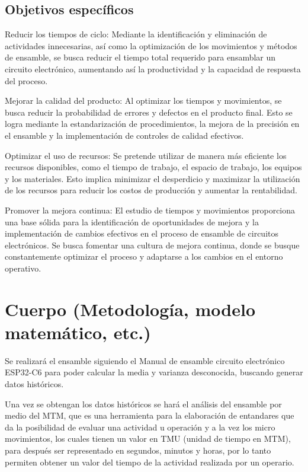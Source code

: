      \subsection{Objetivos específicos}
     
     Reducir los tiempos de ciclo: Mediante la identificación y eliminación de actividades innecesarias, así como la optimización de los movimientos y métodos de ensamble, se busca reducir el tiempo total requerido para ensamblar un circuito electrónico, aumentando así la productividad y la capacidad de respuesta del proceso.
     
     Mejorar la calidad del producto: Al optimizar los tiempos y movimientos, se busca reducir la probabilidad de errores y defectos en el producto final. Esto se logra mediante la estandarización de procedimientos, la mejora de la precisión en el ensamble y la implementación de controles de calidad efectivos.
     
      Optimizar el uso de recursos: Se pretende utilizar de manera más eficiente los recursos disponibles, como el tiempo de trabajo, el espacio de trabajo, los equipos y los materiales. Esto implica minimizar el desperdicio y maximizar la utilización de los recursos para reducir los costos de producción y aumentar la rentabilidad.
     
      Promover la mejora continua: El estudio de tiempos y movimientos proporciona una base sólida para la identificación de oportunidades de mejora y la implementación de cambios efectivos en el proceso de ensamble de circuitos electrónicos. Se busca fomentar una cultura de mejora continua, donde se busque constantemente optimizar el proceso y adaptarse a los cambios en el entorno operativo. 
     
     \section{Cuerpo (Metodología, modelo matemático, etc.)}
     
     Se realizará el ensamble siguiendo el Manual de ensamble circuito electrónico ESP32-C6 para poder calcular la media y varianza desconocida, buscando generar datos históricos. 
         
          Una vez se obtengan los datos históricos se hará el análisis del ensamble por medio del MTM, que es una herramienta para la elaboración de entandares que da la posibilidad de evaluar una actividad u operación y a la vez los micro movimientos, los cuales tienen un valor en TMU (unidad de tiempo en MTM), para después ser representado en segundos, minutos y horas, por lo tanto permiten obtener un valor del tiempo de la actividad realizada por un operario.
          \cite{navarro2006estandarizacion}
          
